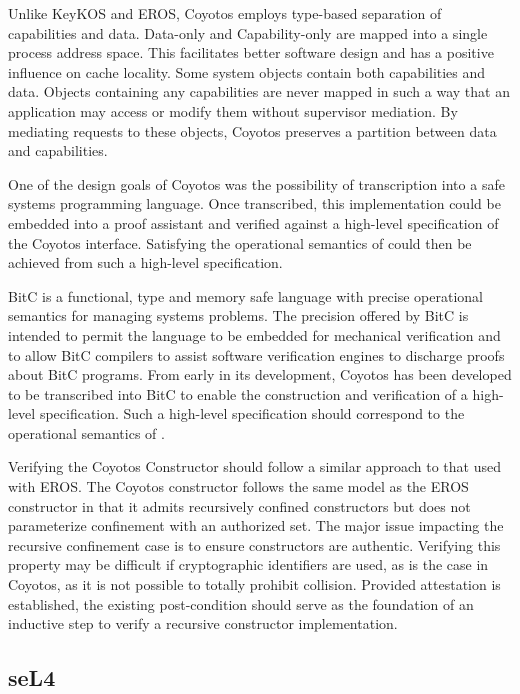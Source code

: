 Unlike KeyKOS and EROS, Coyotos employs type-based separation of capabilities and data.
Data-only  and Capability-only  are mapped into a single process address space.
This facilitates better software design and has a positive influence on cache locality.
Some system objects contain both capabilities and data.
Objects containing any capabilities are never mapped in such a way that an application may access or modify them without supervisor mediation.
By mediating requests to these objects, Coyotos preserves a partition between data and capabilities.

One of the design goals of Coyotos was the possibility of transcription into a safe systems programming language.
Once transcribed, this implementation could be embedded into a proof assistant and verified against a high-level specification of the Coyotos interface.
Satisfying the operational semantics of \TMmodelName{} could then be achieved from such a high-level specification.

BitC is a functional, type and memory safe language with precise operational semantics for managing systems problems. \cite{shapiro2008bitc}
The precision offered by BitC is intended to permit the language to be embedded for mechanical verification and to allow BitC compilers to assist software verification engines to discharge proofs about BitC programs.
From early in its development, Coyotos has been developed to be transcribed into BitC to enable the construction and verification of a high-level specification.
Such a high-level specification should correspond to the operational semantics of \TMmodelName{}.
 
Verifying the Coyotos Constructor should follow a similar approach to that used with EROS.
The Coyotos constructor follows the same model as the EROS constructor in that it admits recursively confined constructors but does not parameterize confinement with an authorized set.
The major issue impacting the recursive confinement case is to ensure constructors are authentic.
Verifying this property may be difficult if cryptographic identifiers are used, as is the case in Coyotos, as it is not possible to totally prohibit collision.
Provided attestation is established, the existing post-condition should serve as the foundation of an inductive step to verify a recursive constructor implementation.

\subsection{seL4}
\label{sect:corr:seL4}

